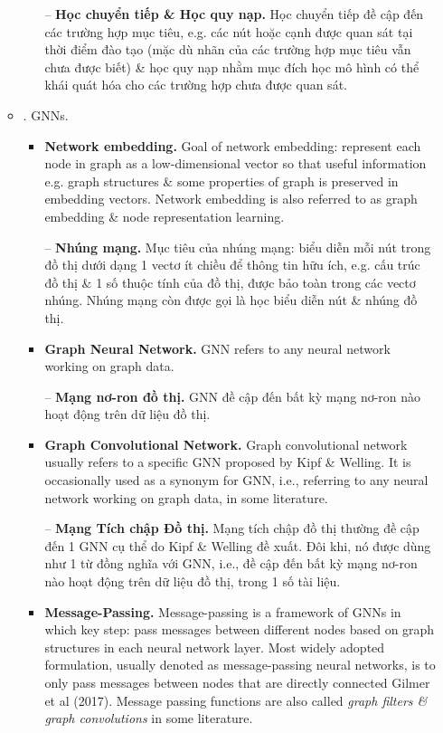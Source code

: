 \documentclass{article}
\begin{document}
\begin{itemize}
\begin{itemize}
\begin{enumerate}
            -- {\bf Học chuyển tiếp \& Học quy nạp.} Học chuyển tiếp đề cập đến các trường hợp mục tiêu, e.g. các nút hoặc cạnh được quan sát tại thời điểm đào tạo (mặc dù nhãn của các trường hợp mục tiêu vẫn chưa được biết) \& học quy nạp nhằm mục đích học mô hình có thể khái quát hóa cho các trường hợp chưa được quan sát.
        \end{enumerate}
        \item {. GNNs.}
        \begin{itemize}
            \item {\bf Network embedding.} Goal of network embedding: represent each node in graph as a low-dimensional vector so that useful information e.g. graph structures \& some properties of graph is preserved in embedding vectors. Network embedding is also referred to as graph embedding \& node representation learning.

            -- {\bf Nhúng mạng.} Mục tiêu của nhúng mạng: biểu diễn mỗi nút trong đồ thị dưới dạng 1 vectơ ít chiều để thông tin hữu ích, e.g. cấu trúc đồ thị \& 1 số thuộc tính của đồ thị, được bảo toàn trong các vectơ nhúng. Nhúng mạng còn được gọi là học biểu diễn nút \& nhúng đồ thị.
            \item {\bf Graph Neural Network.} GNN refers to any neural network working on graph data.

            -- {\bf Mạng nơ-ron đồ thị.} GNN đề cập đến bất kỳ mạng nơ-ron nào hoạt động trên dữ liệu đồ thị.
            \item {\bf Graph Convolutional Network.} Graph convolutional network usually refers to a specific GNN proposed by {\sc Kipf \& Welling}. It is occasionally used as a synonym for GNN, i.e., referring to any neural network working on graph data, in some literature.

            -- {\bf Mạng Tích chập Đồ thị.} Mạng tích chập đồ thị thường đề cập đến 1 GNN cụ thể do {\sc Kipf \& Welling} đề xuất. Đôi khi, nó được dùng như 1 từ đồng nghĩa với GNN, i.e., đề cập đến bất kỳ mạng nơ-ron nào hoạt động trên dữ liệu đồ thị, trong 1 số tài liệu.
            \item {\bf Message-Passing.} Message-passing is a framework of GNNs in which key step: pass messages between different nodes based on graph structures in each neural network layer. Most widely adopted formulation, usually denoted as message-passing neural networks, is to only pass messages between nodes that are directly connected Gilmer et al (2017). Message passing functions are also called {\it graph filters \& graph convolutions} in some literature.


\end{itemize}
\end{itemize}
\end{itemize}
\end{document}
